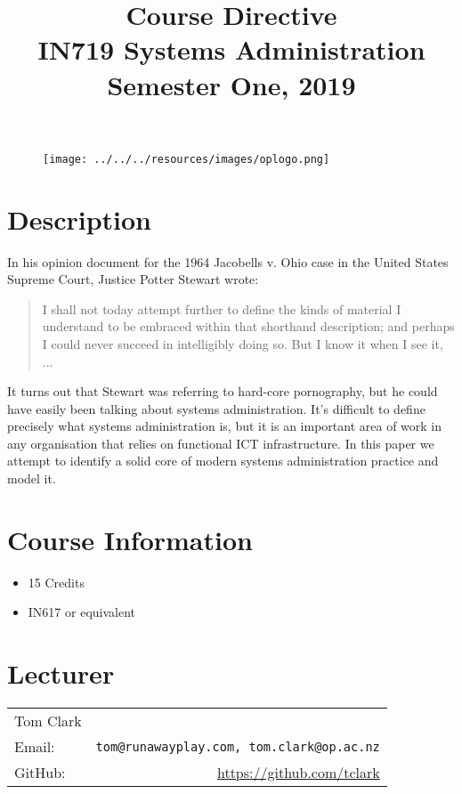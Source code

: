 \documentclass{article}
\begin{document}
\begin{figure}
\texttt{[image: ../../../resources/images/oplogo.png]}
\end{figure}

\title{Course Directive\\IN719 Systems Administration \\Semester One, 2019}
\date{}
\maketitle

\section*{Description}
In his opinion document for the 1964 Jacobells v. Ohio case in the United States Supreme Court, Justice Potter Stewart wrote:
\begin{quote}
I shall not today attempt further to define the kinds of material I understand to be embraced within that shorthand description; and perhaps I could never succeed in intelligibly doing so. But I know it when I see it, ...
\end{quote}
It turns out that Stewart was referring to hard-core pornography, but he could have easily been talking about systems administration. It's difficult to define precisely what systems administration is, but it is an important area of work in any organisation that relies on functional ICT infrastructure. In this paper we attempt to identify a solid core of modern systems administration practice and model it.



\section*{Course Information}
\begin{itemize}
  \item 15 Credits
  \item IN617 or equivalent
\end{itemize}

\section*{Lecturer}
\begin{tabular}{lr}

  Tom Clark &    \\
     Email: & \texttt{tom@runawayplay.com, tom.clark@op.ac.nz} \\
     GitHub: & \url{https://github.com/tclark} 
\end{tabular}
\end{document}
